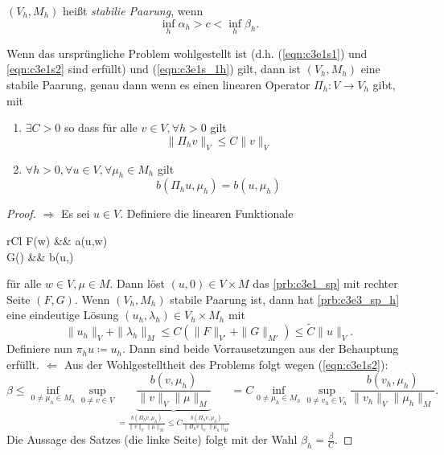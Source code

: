 \documentclass[../skript.tex]{subfiles}
\begin{document}
\begin{definition*}
	$(V_h,M_h)$ heißt \emph{stabilie Paarung}, wenn
	\[
		\inf_h\alpha_h > c < \inf_h\beta_h.
	\]
\end{definition*}

\begin{theorem}\label{thm:c3e3s3}
	Wenn das ursprüngliche Problem wohlgestellt ist (d.h. (\ref{eqn:c3e1s1}) und \ref{eqn:c3e1s2} sind erfüllt) und (\ref{eqn:c3e1s_1h}) gilt, dann ist $(V_h,M_h)$ eine stabile Paarung, genau dann wenn es einen linearen Operator $\Pi_h:V\to V_h$ gibt, mit
	\begin{enumerate}
		\item $\exists C>0$ so dass für alle $v\in V,\forall h>0$ gilt
				\[
					\|\Pi_h v\|_V\leq C\|v\|_V
				\]
		\item $\forall h>0,\forall u\in V,\forall\mu_h\in M_h$ gilt
				\[
					b(\Pi_h u,\mu_h) = b(u,\mu_h)
				\]
	\end{enumerate}
\end{theorem}

\begin{proof}
	\textbf{$\Rightarrow$  }
	Es sei $u\in V$. Definiere die linearen Funktionale 
	\begin{IEEEeqnarray*}{rCl}
		F(w) &\coloneqq& a(u,w) \\
		G(\mu) &\coloneqq& b(u,\mu)
	\end{IEEEeqnarray*}
	für alle $w\in V,\mu\in M$. Dann löst $(u,0)\in V\times M$ das \cref{prb:c3e1_sp} mit rechter Seite $(F,G)$. Wenn $(V_h,M_h)$ stabile Paarung ist, dann hat \cref{prb:c3e3_sp_h} eine eindeutige Lösung $(u_h,\lambda_h)\in V_h\times M_h$ mit
	\[
		\|u_h\|_{V} + \|\lambda_h\|_{M}\leq C\left( \|F\|_{V'} + \|G\|_{M'} \right) \leq \tilde{C}\|u\|_V.
	\]
	Definiere nun
	$\pi_h u\coloneqq u_h$. Dann sind beide Vorrausetzungen aus der Behauptung erfüllt.\newline\newline\noindent
	\textbf{$\Leftarrow$  } Aus der Wohlgestelltheit des Problems folgt wegen (\ref{eqn:c3e1s2}):
	\[
		\beta \leq \inf_{0\not=\mu_h\in M_h}\sup_{0\not=v\in V}\underbrace{\frac{b(v,\mu_h)}{\|v\|_V\|\mu\|_M}}_{=\frac{b(\Pi_hv,\mu_h)}{\|v\|_V\|\mu\|_M} \leq C\frac{b(\Pi_h v,\mu_h)}{\|\Pi_h v\|_V\|\mu_h\|_M}}
		=  C\inf_{0\not=\mu_h\in M_h}\sup_{0\not=v_h\in V_h} \frac{b(v_h,\mu_h)}{\|v_h\|_V\|\mu_h\|_M}.
	\]
	Die Aussage des Satzes (die linke Seite) folgt mit der Wahl $\beta_h = \frac{\beta}{C}$.
\end{proof}
\end{document}
